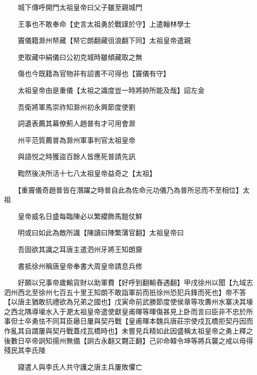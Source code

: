 　　城下傳呼開門太祖皇帝曰父子雖至親城門

　　王事也不敢奉命【史言太祖勇於戰謹於守】上遣翰林學士

　　竇儀籍滁州帑藏【帑它朗翻藏徂浪翻下同】太祖皇帝遣親

　　吏取藏中絹儀曰公初克城時雖傾藏取之無

　　傷也今既籍為官物非有詔書不可得也【竇儀有守】

　　太祖皇帝由是重儀【太祖之識度豈一時將帥所能及哉】詔左金

　　吾衛將軍馬崇祚知滁州初永興節度使劉

　　詞遺表薦其幕僚薊人趙普有才可用會滁

　　州平范質薦普為滁州軍事判官太祖皇帝

　　與語悦之時獲盜百餘人皆應死普請先訊

　　鞫然後决所活十七八太祖皇帝益奇之【太祖】

　　【重竇儀奇趙普皆在潛躍之時普自此為佐命元功儀乃為普所忌而不至相位】太祖

　　皇帝威名日盛每臨陳必以繁纓飾馬鎧仗鮮

　　明或曰如此為敵所識【陳讀曰陣繁蒲官翻】太祖皇帝曰

　　吾固欲其識之耳唐主遣泗州牙將王知朗齎

　　書抵徐州稱唐皇帝奉書大周皇帝請息兵修

　　好願以兄事帝歲輸貨財以助軍費【好呼到翻輸舂遇翻】甲戌徐州以聞【九域志泗州西北至徐州七百五十里王知朗不敢詣軍前而扺徐州恐犯兵鋒而死也】帝不答【以唐主猶敢抗禮欲為兄弟之國也】戊寅命前武勝節度使侯章等攻夀州水寨决其壕之西北隅導壕水入于淝太祖皇帝遣使獻皇甫暉等暉傷甚見上卧而言曰臣非不忠於所事但士卒勇怯不同耳臣曏日屢與契丹戰【皇甫暉本魏兵唐莊宗使戍瓦橋拒契丹因而作亂其自謂屢與契丹戰蓋戍瓦橋時也】未嘗見兵精如此因盛稱太祖皇帝之勇上釋之後數日卒帝詗知揚州無備【詗古永翻又翾正翻】己卯命韓令坤等將兵襲之戒以毋得殘民其李氏陵

　　寢遣人與李氏人共守護之唐主兵屢敗懼亡


